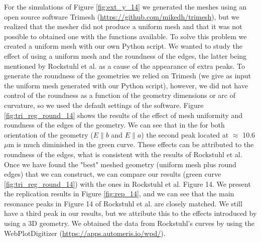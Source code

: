 For the simulations of Figure \ref{fig:ext_y_14} we generated the meshes using an open source software Trimesh (\url{https://github.com/mikedh/trimesh}), 
but we realized that the mesher did not produce a uniform mesh and that it was not possible to obtained one with the functions available. To solve this problem 
we created a uniform mesh with our own Python script. We wanted to study the effect of using a uniform mesh and the roundness of the edges, the latter being mentioned by 
Rockstuhl et al. as a cause of the appearance of extra peaks. To generate the roundness of the geometries we relied on Trimesh (we give as input the uniform mesh generated 
with our Python script), however, we did not have control of the roundness as a function of the geometry dimensions or arc of curvature, so we used the default settings of
the software. Figure \ref{fig:tri_reg_round_14} shows the results of the effect of mesh uniformity and roundness of the edges of the geometry. We can see that in the for 
both orientation of the geometry ($E\parallel b$ and $E\parallel a$) the second peak located at $\approx$ 10.6 $\mu$m is much diminished in the green curve. These effects 
can be attributed to the roundness of the edges, what is consistent with the results of Rockstuhl et al. Once we have found the "best" meshed geometry (uniform mesh plus 
round edges) that we can construct, we can compare our results (green curve \ref{fig:tri_reg_round_14}) with the ones in Rockstuhl et al. Figure 14. We present the replication 
results in Figure \ref{fig:rep_14}, and we can see that the main resonance peaks in Figure 14 of Rockstuhl et al. are closely matched. We still have a third peak in our 
results, but we attribute this to the effects introduced by using a 3D geometry. We obtained the data from Rockstuhl's curves by using the WebPlotDigitizer
(\url{https://apps.automeris.io/wpd/}).
 

